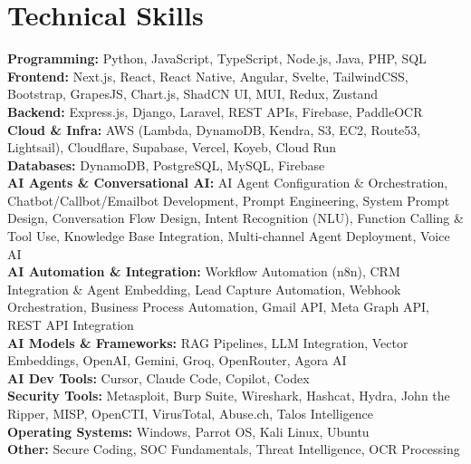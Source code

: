 \documentclass[letterpaper,11pt]{article}
\begin{document}
\section{Technical Skills}
\begin{itemize}[leftmargin=0.15in, label={}]
  \small{\item{
    \textbf{Programming:} Python, JavaScript, TypeScript, Node.js, Java, PHP, SQL \\ \vspace{2pt}
    \textbf{Frontend:} Next.js, React, React Native, Angular, Svelte, TailwindCSS, Bootstrap, GrapesJS, Chart.js, ShadCN UI, MUI, Redux, Zustand \\ \vspace{2pt}
    \textbf{Backend:} Express.js, Django, Laravel, REST APIs, Firebase, PaddleOCR \\ \vspace{2pt}
    \textbf{Cloud \& Infra:} AWS (Lambda, DynamoDB, Kendra, S3, EC2, Route53, Lightsail), Cloudflare, Supabase, Vercel, Koyeb, Cloud Run \\ \vspace{2pt}
    \textbf{Databases:} DynamoDB, PostgreSQL, MySQL, Firebase \\ \vspace{2pt}
    \textbf{AI Agents \& Conversational AI:} AI Agent Configuration \& Orchestration, Chatbot/Callbot/Emailbot Development, Prompt Engineering, System Prompt Design, Conversation Flow Design, Intent Recognition (NLU), Function Calling \& Tool Use, Knowledge Base Integration, Multi-channel Agent Deployment, Voice AI \\ \vspace{2pt}
    \textbf{AI Automation \& Integration:} Workflow Automation (n8n), CRM Integration \& Agent Embedding, Lead Capture Automation, Webhook Orchestration, Business Process Automation, Gmail API, Meta Graph API, REST API Integration \\ \vspace{2pt}
    \textbf{AI Models \& Frameworks:} RAG Pipelines, LLM Integration, Vector Embeddings, OpenAI, Gemini, Groq, OpenRouter, Agora AI \\ \vspace{2pt}
    \textbf{AI Dev Tools:} Cursor, Claude Code, Copilot, Codex \\ \vspace{2pt}
    \textbf{Security Tools:} Metasploit, Burp Suite, Wireshark, Hashcat, Hydra, John the Ripper, MISP, OpenCTI, VirusTotal, Abuse.ch, Talos Intelligence \\ \vspace{2pt}
    \textbf{Operating Systems:} Windows, Parrot OS, Kali Linux, Ubuntu \\ \vspace{2pt}
    \textbf{Other:} Secure Coding, SOC Fundamentals, Threat Intelligence, OCR Processing
  }}
\end{itemize}
\vspace{-14pt}
\end{document}
